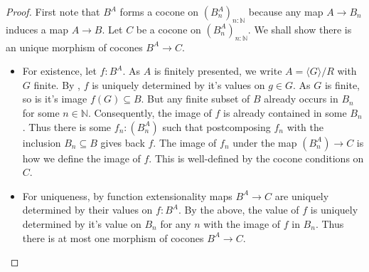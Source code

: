 \documentclass{../util/zariski-small}
\begin{document}
\begin{proof}
  First note that $B^A$ forms a cocone on $(B_n^A)_{n:\mathbb N}$ 
  because any map $A \to B_n$ induces a map $A \to B$. 
  Let $C$ be a cocone on $(B_n^A)_{n:\mathbb N}$. 
  We shall show there is an unique morphism of cocones $B^A \to C$. 
  \begin{itemize}
    \item For existence, let $f:B^A$. 
      As $A$ is finitely presented, we write $A = \langle G \rangle / R$ with $G$ finite.
      By , $f$ is uniquely determined by it's values on $g\in G$. 
      As $G$ is finite, so is it's image $f(G)\subseteq B$. 
      But any finite subset of $B$ already occurs in $B_n$ for some $n\in\mathbb N$. 
      Consequently, the image of $f$ is already contained in some $B_n$. 
      Thus there is some $f_n:(B_n^A)$ such that postcomposing 
      $f_n$ with the inclusion $B_n \subseteq B$ gives back $f$. 
      The image of $f_n$ under the map $(B_n^A) \to C$ is how we define the image of $f$. 
      This is well-defined by the cocone conditions on $C$. 
    \item 
      For uniqueness, by function extensionality maps $B^A \to C$ are uniquely determined by their values on 
      $f:B^A$. By the above, the value of $f$ is uniquely determined by it's value on $B_n$ for 
      any $n$ with the image of $f$ in $B_n$. Thus there is at most one morphism of cocones $B^A \to C$. 
  \end{itemize}
\end{proof}
\end{document}
